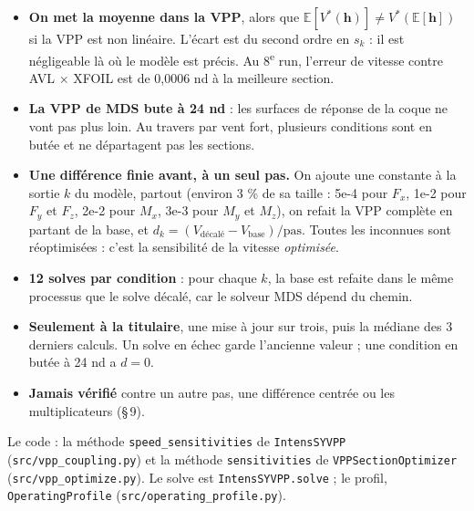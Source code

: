 \documentclass[11pt,a4paper]{article}
\newcommand{\vh}{\bm{h}}
\newcommand{\py}[1]{\texttt{#1}}
\begin{document}
\begin{subtilite}
\begin{itemize}
  \item \textbf{On met la moyenne dans la VPP}, alors que $\mathbb E[V^\ast(\vh)]\ne V^\ast(\mathbb E[\vh])$ si
        la VPP est non linéaire. L'écart est du second ordre en $s_k$ : il est négligeable là où le modèle est
        précis. Au 8\textsuperscript{e} run, l'erreur de vitesse contre AVL × XFOIL est de 0,0006 nd à la
        meilleure section.
  \item \textbf{La VPP de MDS bute à 24 nd} : les surfaces de réponse de la coque ne vont pas plus loin. Au
        travers par vent fort, plusieurs conditions sont en butée et ne départagent pas les sections.
\end{itemize}
\end{subtilite}

\begin{danslecode}
\begin{itemize}
  \item \textbf{Une différence finie avant, à un seul pas.} On ajoute une constante à la sortie $k$ du modèle,
        partout (environ 3 \% de sa taille : 5e-4 pour $F_x$, 1e-2 pour $F_y$ et $F_z$, 2e-2 pour $M_x$, 3e-3
        pour $M_y$ et $M_z$), on refait la VPP complète en partant de la base, et
        $d_k=(V_{\text{décalé}}-V_{\text{base}})/\text{pas}$. Toutes les inconnues sont réoptimisées : c'est la
        sensibilité de la vitesse \emph{optimisée}.
  \item \textbf{12 solves par condition} : pour chaque $k$, la base est refaite dans le même processus que le
        solve décalé, car le solveur MDS dépend du chemin.
  \item \textbf{Seulement à la titulaire}, une mise à jour sur trois, puis la médiane des 3 derniers calculs. Un
        solve en échec garde l'ancienne valeur ; une condition en butée à 24 nd a $d=0$.
  \item \textbf{Jamais vérifié} contre un autre pas, une différence centrée ou les multiplicateurs (§\,9).
\end{itemize}
Le code : la méthode \py{speed\_sensitivities} de \py{IntensSYVPP} (\py{src/vpp\_coupling.py}) et la
méthode \py{sensitivities} de \py{VPPSectionOptimizer} (\py{src/vpp\_optimize.py}). Le solve est
\py{IntensSYVPP.solve} ; le profil, \py{OperatingProfile} (\py{src/operating\_profile.py}).
\end{danslecode}
\end{document}
